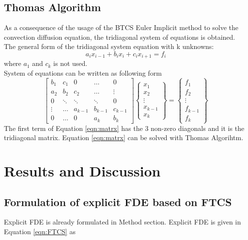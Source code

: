 \documentclass[letterpaper,12pt]{article}
\begin{document}
\subsection{Thomas Algorithm}
As a consequence of the usage of the BTCS Euler Implicit method to solve the convection diffusion
equation, the tridiagonal system of equations is obtained. The general form of the tridiagonal system
equation with k unknowns:
\begin{equation}
	a_i x_{i-1}+b_i x_i+c_i x_{i+1}=f_i
\end{equation}
where $a_1$ and $c_k$ is not used.\\System of equations can be written as following form
\begin{equation}
	\begin{bmatrix}
		b_1 & c_1    & 0      &\dots    &0   \\
		a_2 & b_2    & c_2    &\dots    &\vdots\\
		0   & \ddots & \ddots & \ddots	& 0    \\
		\vdots& \dots&a_{k-1} & b_{k-1} & c_{k-1}\\
		0   & \dots  & 0      & a_k     & b_k 
		\end{bmatrix}
	\begin{Bmatrix}
		x_1\\
		x_2\\
		\vdots\\
		x_{k-1}\\
		x_k
		\end{Bmatrix}
	=
	\begin{Bmatrix}
		f_1\\
		f_2\\
		\vdots\\
		f_{k-1}\\
		f_k
	\end{Bmatrix}
	\label{eqn:matrx}
\end{equation}
The first term of Equation \ref{eqn:matrx} has the 3 non-zero diagonals and
it is the tridiagonal matrix. Equation \ref{eqn:matrx} can be solved with Thomas
Algorihtm.
\section{Results and Discussion}
\subsection{Formulation of explicit FDE based on FTCS }

Explicit FDE is already formulated in Method section. Explicit FDE is given in Equation \ref{eqn:FTCS} as
\end{document}
